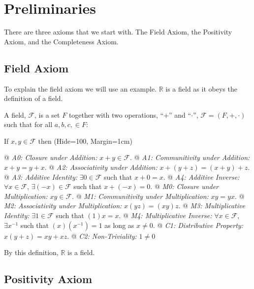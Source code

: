\section{Preliminaries}

There are three axioms that we start with. The Field Axiom, the Positivity Axiom, and the Completeness Axiom.

    \subsection{Field Axiom}

    To explain the field axiom we will use an example. $\mathbb{R}$ is a field as it obeys the definition of a field.

    \begin{definition}[Field]
        A field, $\mathcal{F}$, is a set $F$ together with two operations, ``$+$'' and ``$\cdot$'',
        $\mathcal{F}=(F,+,\cdot)$ such that for all $a, b, c, \in F$:

        If $x, y \in \mathcal{F}$ then
        \NewList
        \ListProperties(Hide=100, Margin=1cm)
        \begin{easylist}
            @ \textit{A0: Closure under Addition:} $x + y \in \mathcal{F}$.
            @ \textit{A1: Communitivity under Addition:} $x + y = y + x$.
            @ \textit{A2: Associativity under Addition:} $x + (y + z) = (x + y) + z$.
            @ \textit{A3: Additive Identity:} $\exists 0 \in \mathcal{F}$ such that $x + 0 = x$.
            @ \textit{A4: Additive Inverse:} $\forall x \in \mathcal{F}$, $\exists (-x) \in \mathcal{F}$ such that $x + (-x) = 0$.
            @ \textit{M0: Closure under Multiplication:} $xy \in \mathcal{F}$.
            @ \textit{M1: Communitivity under Multiplication:} $xy = yx$.
            @ \textit{M2: Associativity under Multiplication:} $x(yz) = (xy)z$.
            @ \textit{M3: Multiplicative Identity:} $\exists 1 \in \mathcal{F}$ such that $(1)x = x$.
            @ \textit{M4: Multiplicative Inverse:} $\forall x \in \mathcal{F}$, $\exists x^{-1}$ such that
                $(x)\left(x^{-1}\right) = 1$ as long as $x \neq 0$.
            @ \textit{C1: Distributive Property:} $x(y + z) = xy + xz$.
            @ \textit{C2: Non-Triviality:} $1 \neq 0$
        \end{easylist}
    \end{definition}

    By this definition, $\mathbb{R}$ is a field.

    \subsection{Positivity Axiom}

